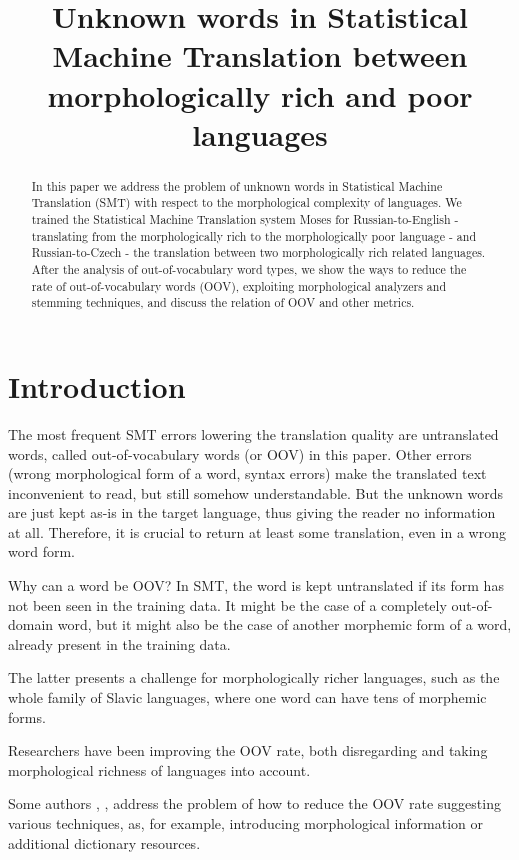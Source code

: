\documentclass[11pt,letterpaper]{article}
\title{Unknown words in Statistical Machine Translation between morphologically
rich and poor languages}
\date{}
\begin{document}
\maketitle
\begin{abstract}
In this paper we address the problem of unknown words in Statistical
Machine Translation (SMT) with respect to the morphological complexity of languages. 
We trained the Statistical Machine Translation system Moses
for Russian-to-English - translating from the morphologically rich to the
morphologically poor language - and Russian-to-Czech - the translation
between two morphologically rich related languages. After the analysis of
out-of-vocabulary word types, we show the ways to reduce the rate of out-of-vocabulary words (OOV), exploiting morphological analyzers
and stemming techniques, and discuss the relation of OOV and other metrics.
\end{abstract}

\section{Introduction}
The most frequent SMT errors lowering the translation quality
are untranslated words, called out-of-vocabulary words (or OOV) in this paper. Other errors (wrong morphological form of a word, syntax errors) make the translated text inconvenient to read, but still somehow understandable. But the unknown words are just kept as-is in the target language, thus giving the reader no information at all. Therefore, it is crucial to return at least some translation, even in a wrong word form.

Why can a word be OOV? In SMT, the word is kept untranslated if its form has not been seen in the training data. It might be the case of a completely out-of-domain word, but it might also be the case of another morphemic form of a word, already present in the training data. 

The latter presents a challenge for morphologically richer languages, such as the whole family of Slavic languages, where one word can have tens of morphemic forms.

Researchers have been improving the OOV rate, both disregarding and taking morphological richness of languages into account.

Some authors \cite{habash}, \cite{turchi}, \cite{bojartamchyna} address the problem of how to reduce the OOV 
rate suggesting
various techniques, as, for example, introducing morphological information or additional dictionary
resources. 
\end{document}
